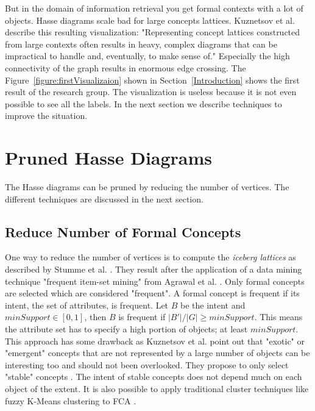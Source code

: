 \documentclass[11pt]{report}
\begin{document}
But in the domain of information retrieval you get formal contexts with a lot of objects. Hasse diagrams scale bad for large concepts lattices. Kuznetsov et al. \cite{Kuznetsov20072}  describe this resulting visualization: "Representing concept lattices constructed from large contexts often results in heavy, complex diagrams that can be impractical to handle and, eventually, to make sense of." Especially the high connectivity of the graph results in enormous edge crossing. The Figure~\ref{figure:firstVisualizaion} shown in Section~\ref{Introduction} shows the first result of the research group. The visualization is useless because it is not even possible to see all the labels. In the next section we describe techniques to improve the situation.

\section{Pruned Hasse Diagrams}

The Hasse diagrams can be pruned by reducing the number of vertices. The different techniques are discussed in the next section.

\subsection{Reduce Number of Formal Concepts}

One way to reduce the number of vertices is to compute the \textit{iceberg lattices} as described by Stumme et al. \cite{Stumme2002}. They result after the application of a data mining technique "frequent item-set mining" from Agrawal et al. \cite{Agrawal1993}. Only formal concepts are selected which are considered "frequent". A formal concept is frequent if its intent, the set of attributes, is frequent. Let $B$ be the intent and $minSupport \in [0, 1]$, then $B$ is frequent if $ |B'|/|G| \geq minSupport$. This means the attribute set has to specify a high portion of objects; at least $minSupport$. This approach has some drawback as Kuznetsov et al. \cite{Kuznetsov20072} point out that "exotic" or "emergent" concepts that are not represented by a large number of objects can be interesting too and should not been overlooked. They propose to only select "stable" concepts \cite{Kuznetsov20072}. The intent of stable concepts does not depend much on each object of the extent. It is also possible to apply traditional cluster techniques like fuzzy K-Means clustering to FCA \cite{AswaniKumar2010}. \\
\end{document}
